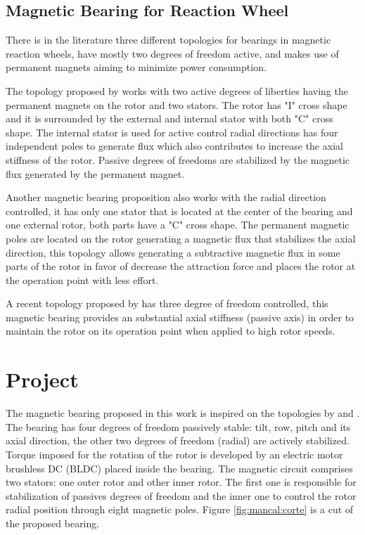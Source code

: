 \documentclass[10pt,fleqn,a4paper,twoside]{article}
\begin{document}
	\subsection{Magnetic Bearing for Reaction Wheel}
	
	There is in the literature three different topologies for  bearings in magnetic reaction wheels, have mostly two degrees of freedom active, and makes use of permanent magnets aiming to minimize power consumption.
	
	The topology proposed by \cite{Bernus1998} works with two active degrees of liberties having the permanent magnets on the rotor and two stators. The rotor has  "I" cross shape and it is surrounded by the external and internal stator with both "C" cross shape. The internal stator is used for active control radial directions has four independent poles to generate flux which also contributes to increase the axial stiffness of the rotor. Passive degrees of freedoms are stabilized by the magnetic flux generated by the permanent magnet.
	
	Another magnetic bearing proposition\citep{Scharfe2001} also works with the radial direction controlled, it has only one stator that is located at the center of the bearing and one external rotor, both parts have a "C" cross shape. The permanent magnetic poles are located on the rotor generating a magnetic flux that stabilizes the axial direction, this topology allows generating a subtractive magnetic flux in some parts of the rotor in favor of decrease the attraction force and places the rotor at the operation point with less effort. 
	
	A recent topology proposed by \cite{Bangcheng2012} has  three degree of freedom controlled, this magnetic bearing  provides an substantial axial stiffness (passive axis) in order to maintain the rotor on its operation point when applied to high rotor speeds.
		
	\section{Project}
	
	The magnetic bearing proposed in this work is inspired on the topologies by \cite{Bernus1998} and \cite{Scharfe2001}. The bearing has four degrees of freedom passively stable: tilt, row, pitch and its axial direction, the other two degrees of freedom (radial) are actively stabilized. Torque imposed for the rotation of the rotor is developed by an electric motor brushless DC (BLDC) placed inside the bearing. The magnetic circuit comprises two stators: one outer rotor and other inner rotor. The first one is responsible for stabilization of passives degrees of freedom and the inner one to control the rotor radial position through eight magnetic poles.%
	Figure \ref{fig:mancal:corte} is a cut of the proposed bearing.
	
\end{document}
